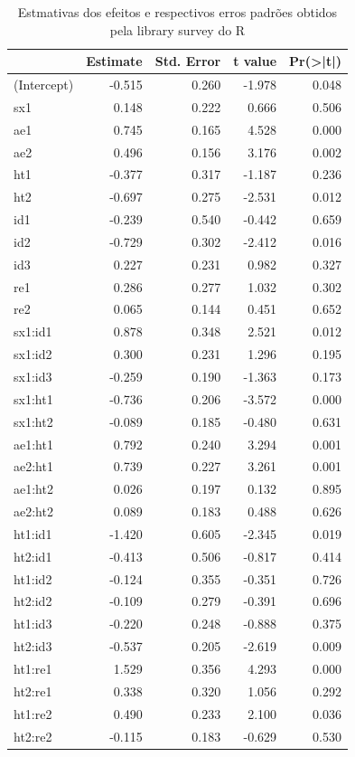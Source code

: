 \documentclass[]{book}
\numberwithin{example}{chapter}
\numberwithin{remark}{chapter}
\numberwithin{definition}{chapter}
\begin{document}
\begin{table}

\caption{\label{tab:logit}Estmativas dos efeitos e respectivos erros padrões obtidos pela library survey do R}
\centering
\begin{tabular}[t]{lrrrr}
\toprule
  & Estimate & Std. Error & t value & Pr(>|t|)\\
\midrule
(Intercept) & -0.515 & 0.260 & -1.978 & 0.048\\
sx1 & 0.148 & 0.222 & 0.666 & 0.506\\
ae1 & 0.745 & 0.165 & 4.528 & 0.000\\
ae2 & 0.496 & 0.156 & 3.176 & 0.002\\
ht1 & -0.377 & 0.317 & -1.187 & 0.236\\
\addlinespace
ht2 & -0.697 & 0.275 & -2.531 & 0.012\\
id1 & -0.239 & 0.540 & -0.442 & 0.659\\
id2 & -0.729 & 0.302 & -2.412 & 0.016\\
id3 & 0.227 & 0.231 & 0.982 & 0.327\\
re1 & 0.286 & 0.277 & 1.032 & 0.302\\
\addlinespace
re2 & 0.065 & 0.144 & 0.451 & 0.652\\
sx1:id1 & 0.878 & 0.348 & 2.521 & 0.012\\
sx1:id2 & 0.300 & 0.231 & 1.296 & 0.195\\
sx1:id3 & -0.259 & 0.190 & -1.363 & 0.173\\
sx1:ht1 & -0.736 & 0.206 & -3.572 & 0.000\\
\addlinespace
sx1:ht2 & -0.089 & 0.185 & -0.480 & 0.631\\
ae1:ht1 & 0.792 & 0.240 & 3.294 & 0.001\\
ae2:ht1 & 0.739 & 0.227 & 3.261 & 0.001\\
ae1:ht2 & 0.026 & 0.197 & 0.132 & 0.895\\
ae2:ht2 & 0.089 & 0.183 & 0.488 & 0.626\\
\addlinespace
ht1:id1 & -1.420 & 0.605 & -2.345 & 0.019\\
ht2:id1 & -0.413 & 0.506 & -0.817 & 0.414\\
ht1:id2 & -0.124 & 0.355 & -0.351 & 0.726\\
ht2:id2 & -0.109 & 0.279 & -0.391 & 0.696\\
ht1:id3 & -0.220 & 0.248 & -0.888 & 0.375\\
\addlinespace
ht2:id3 & -0.537 & 0.205 & -2.619 & 0.009\\
ht1:re1 & 1.529 & 0.356 & 4.293 & 0.000\\
ht2:re1 & 0.338 & 0.320 & 1.056 & 0.292\\
ht1:re2 & 0.490 & 0.233 & 2.100 & 0.036\\
ht2:re2 & -0.115 & 0.183 & -0.629 & 0.530\\
\bottomrule
\end{tabular}
\end{table}
\end{document}
